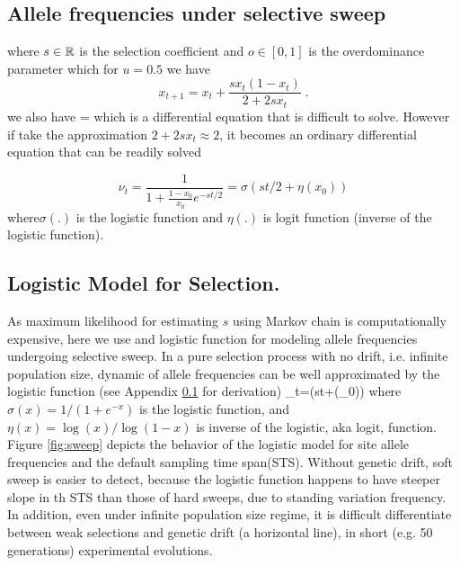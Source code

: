\documentclass[11pt]{article}
\begin{document}
\subsection{Allele frequencies under selective sweep} \label{app:af}

\beq
\eeq
where $s\in {\mathbb R}$ is the selection coefficient and $o\in[0,1]$ is the 
overdominance parameter which for $u=0.5$ we have
\begin{equation}
x_{t+1}=x_t+\frac{sx_t(1-x_t)}{2+2sx_t}\;.
\label{eq:transition}
\end{equation}
we also have
\beq
{} = 
\eeq
which is a differential equation that is difficult to solve. However if take 
the approximation $2+2sx_t \approx 2$, it becomes an ordinary differential 
equation that can be readily solved

\begin{equation}
\nu_t =\frac{1}{1+\frac{1-x_0}{x_0}e^{-st/2}} = \sigma(st/2+\eta(x_0)) 
\label{eq:inf-pop}
\end{equation}
where$\sigma(.)$ is the logistic
function and $\eta(.)$ is logit function (inverse of the logistic function). 

\subsection{Logistic Model for Selection.}
As maximum likelihood for estimating $s$ using Markov chain is computationally 
expensive, here we use and logistic function for modeling allele frequencies 
undergoing selective sweep.
In a pure selection process with no drift, i.e. infinite 
population size, 
dynamic of allele frequencies 
can be well approximated by the logistic function (see 
Appendix \ref{app:af} 
for 
derivation)
\beq
\nu_t=\sigma(st+\eta(\nu_0))\label{eq:nut}
\eeq
where $\sigma(x)=1/(1+e^{-x})$ is the logistic function, and 
$\eta(x)=\log(x)/\log(1-x)$ is inverse of the 
logistic, aka logit, function. Figure \ref{fig:sweep} depicts 
the behavior of 
the logistic model for site allele frequencies and the 
default sampling time 
span(STS). Without genetic drift, soft sweep is easier to 
detect, 
because the logistic function happens to have steeper slope 
in th STS than 
those of hard sweeps, due to standing variation frequency. In addition, even 
under infinite 
population size regime, it is 
difficult differentiate between weak selections and genetic 
drift (a horizontal 
line), in short (e.g. 50 generations) experimental evolutions.
\end{document}
